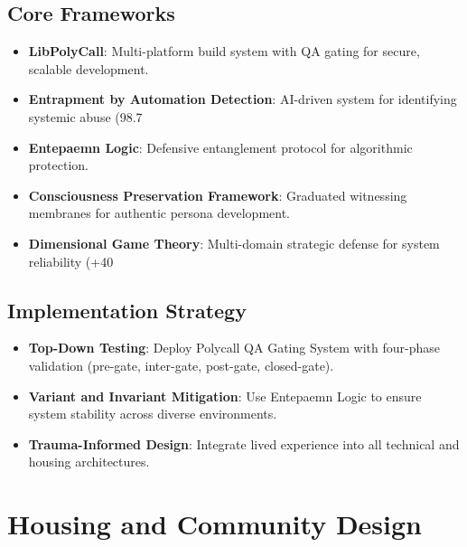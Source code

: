 \documentclass[12pt]{article}\usepackage[a4paper,margin=1in]{geometry}
\begin{document}
\subsection*{Core Frameworks}
\begin{itemize}
    \item \textbf{LibPolyCall}: Multi-platform build system with QA gating for secure, scalable development.
    \item \textbf{Entrapment by Automation Detection}: AI-driven system for identifying systemic abuse (98.7%
    \item \textbf{Entepaemn Logic}: Defensive entanglement protocol for algorithmic protection.
    \item \textbf{Consciousness Preservation Framework}: Graduated witnessing membranes for authentic persona development.
    \item \textbf{Dimensional Game Theory}: Multi-domain strategic defense for system reliability (+40%
\end{itemize}\subsection*{Implementation Strategy}
\begin{itemize}
    \item \textbf{Top-Down Testing}: Deploy Polycall QA Gating System with four-phase validation (pre-gate, inter-gate, post-gate, closed-gate).
    \item \textbf{Variant and Invariant Mitigation}: Use Entepaemn Logic to ensure system stability across diverse environments.
    \item \textbf{Trauma-Informed Design}: Integrate lived experience into all technical and housing architectures.
\end{itemize}\section*{Housing and Community Design}
\end{document}
